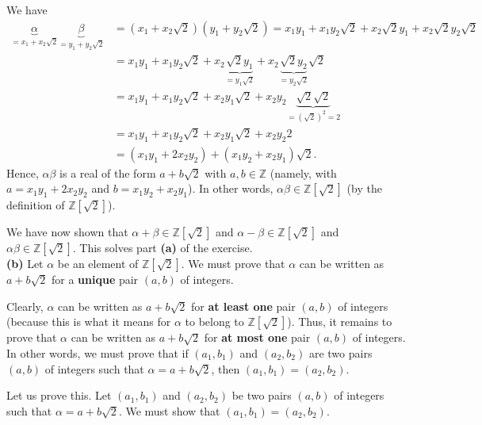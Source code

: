 \documentclass[paper=a4, fontsize=12pt]{scrartcl}%
\theoremstyle{plainsl}
\theoremstyle{definition}
\theoremstyle{remark}
\begin{document}
We have%
\begin{align}
\underbrace{\alpha}_{=x_{1}+x_{2}\sqrt{2}}\underbrace{\beta}_{=y_{1}%
+y_{2}\sqrt{2}}  &  =\left(  x_{1}+x_{2}\sqrt{2}\right)  \left(  y_{1}%
+y_{2}\sqrt{2}\right)  =x_{1}y_{1}+x_{1}y_{2}\sqrt{2}+x_{2}\sqrt{2}y_{1}%
+x_{2}\sqrt{2}y_{2}\sqrt{2}\nonumber\\
&  =x_{1}y_{1}+x_{1}y_{2}\sqrt{2}+x_{2}\underbrace{\sqrt{2}y_{1}}_{=y_{1}%
\sqrt{2}}+x_{2}\underbrace{\sqrt{2}y_{2}}_{=y_{2}\sqrt{2}}\sqrt{2}\nonumber\\
&  =x_{1}y_{1}+x_{1}y_{2}\sqrt{2}+x_{2}y_{1}\sqrt{2}+x_{2}y_{2}%
\underbrace{\sqrt{2}\sqrt{2}}_{=\left(  \sqrt{2}\right)  ^{2}=2}\nonumber\\
&  =x_{1}y_{1}+x_{1}y_{2}\sqrt{2}+x_{2}y_{1}\sqrt{2}+x_{2}y_{2}2\nonumber\\
&  =\left(  x_{1}y_{1}+2x_{2}y_{2}\right)  +\left(  x_{1}y_{2}+x_{2}%
y_{1}\right)  \sqrt{2}. \label{sol.Zsqrt2.basics.a.ab}%
\end{align}
Hence, $\alpha\beta$ is a real of the form $a+b\sqrt{2}$ with $a,b\in
\mathbb{Z}$ (namely, with $a=x_{1}y_{1}+2x_{2}y_{2}$ and $b=x_{1}y_{2}%
+x_{2}y_{1}$). In other words, $\alpha\beta\in\mathbb{Z}\left[  \sqrt
{2}\right]  $ (by the definition of $\mathbb{Z}\left[  \sqrt{2}\right]  $).

We have now shown that $\alpha+\beta\in\mathbb{Z}\left[  \sqrt{2}\right]  $
and $\alpha-\beta\in\mathbb{Z}\left[  \sqrt{2}\right]  $ and $\alpha\beta
\in\mathbb{Z}\left[  \sqrt{2}\right]  $. This solves part \textbf{(a)} of the
exercise.\\[0.4cm]

\textbf{(b)} Let $\alpha$ be an element of $\mathbb{Z}\left[  \sqrt{2}\right]
$. We must prove that $\alpha$ can be written as $a+b\sqrt{2}$ for a
\textbf{unique} pair $\left(  a,b\right)  $ of integers.

Clearly, $\alpha$ can be written as $a+b\sqrt{2}$ for \textbf{at least one}
pair $\left(  a,b\right)  $ of integers (because this is what it means for
$\alpha$ to belong to $\mathbb{Z}\left[  \sqrt{2}\right]  $). Thus, it remains
to prove that $\alpha$ can be written as $a+b\sqrt{2}$ for \textbf{at most
one} pair $\left(  a,b\right)  $ of integers. In other words, we must prove
that if $\left(  a_{1},b_{1}\right)  $ and $\left(  a_{2},b_{2}\right)  $ are
two pairs $\left(  a,b\right)  $ of integers such that $\alpha=a+b\sqrt{2}$,
then $\left(  a_{1},b_{1}\right)  =\left(  a_{2},b_{2}\right)  $.

Let us prove this. Let $\left(  a_{1},b_{1}\right)  $ and $\left(  a_{2}%
,b_{2}\right)  $ be two pairs $\left(  a,b\right)  $ of integers such that
$\alpha=a+b\sqrt{2}$. We must show that $\left(  a_{1},b_{1}\right)  =\left(
a_{2},b_{2}\right)  $.
\end{document}
